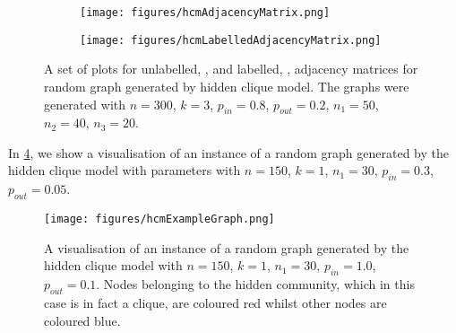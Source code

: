 \begin{figure}
	\centering
	\begin{subfigure}{.5\textwidth}
		\centering
		\texttt{[image: figures/hcmAdjacencyMatrix.png]}
		\caption{}
		\label{fig:hcmUnlabelledAdjacencyMatrixPlot}
	\end{subfigure}%
	\begin{subfigure}{.5\textwidth}
		\centering
		\texttt{[image: figures/hcmLabelledAdjacencyMatrix.png]}
		\caption{}
		\label{fig:hcmLabelledAdjacencyMatrixPlot}
	\end{subfigure}
	\caption[Plots of adjacency matrices of graph generated by hidden clique model]{\label{fig:hcmAdjacencyMatricesPlots} A set of plots for unlabelled, , and labelled, , adjacency matrices for random graph generated by hidden clique model. The graphs were generated with $n = 300$, $k = 3$, $p_{in} = 0.8$, $p_{out} = 0.2$, $n_{1} = 50$, $n_{2} = 40$, $n_{3} = 20$.}
\end{figure}

In \cref{fig:hcmExampleGraph}, we show a visualisation of an instance of a random graph generated by the hidden clique model with parameters with $n = 150$, $k = 1$, $n_{1} = 30$, $p_{in} = 0.3$, $p_{out} = 0.05$.

\begin{figure}
	\centering
	\texttt{[image: figures/hcmExampleGraph.png]}
	\caption[Visualisation of a graph generated by the hidden clique model]{\label{fig:hcmExampleGraph} A visualisation of an instance of a random graph generated by the hidden clique model with $n = 150$, $k = 1$, $n_{1} = 30$, $p_{in} = 1.0$, $p_{out} = 0.1$. Nodes belonging to the hidden community, which in this case is in fact a clique, are coloured red whilst other nodes are coloured blue.}
\end{figure}

